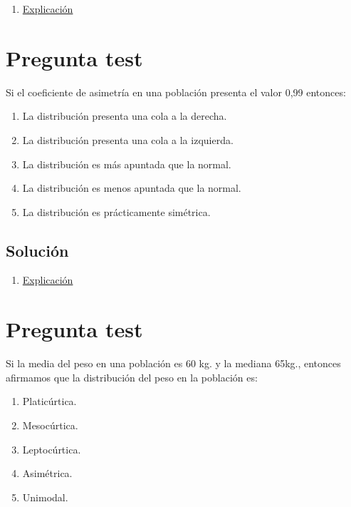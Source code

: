 \documentclass[
]{book}
\providecommand{\tightlist}{%
  \setlength{\itemsep}{0pt}\setlength{\parskip}{0pt}}
\begin{document}
\begin{enumerate}
\def\labelenumi{\alph{enumi})}
\setcounter{enumi}{4}
\tightlist
\item
  \href{https://en.wikipedia.org/wiki/Coefficient_of_variation}{Explicación}
\end{enumerate}

\hypertarget{pregunta-test-43}{%
\section{Pregunta test}\label{pregunta-test-43}}

Si el coeficiente de asimetría en una población presenta el valor 0,99 entonces:

\begin{enumerate}
\def\labelenumi{\alph{enumi})}
\tightlist
\item
  La distribución presenta una cola a la derecha.
\item
  La distribución presenta una cola a la izquierda.
\item
  La distribución es más apuntada que la normal.
\item
  La distribución es menos apuntada que la normal.
\item
  La distribución es prácticamente simétrica.
\end{enumerate}

\hypertarget{soluciuxf3n-45}{%
\subsection{Solución}\label{soluciuxf3n-45}}

\begin{enumerate}
\def\labelenumi{\alph{enumi})}
\tightlist
\item
  \href{https://1fjmanzano.github.io/bioestadistica/medidas-de-forma.html}{Explicación}
\end{enumerate}

\hypertarget{pregunta-test-44}{%
\section{Pregunta test}\label{pregunta-test-44}}

Si la media del peso en una población es 60 kg. y la mediana 65kg., entonces afirmamos que la distribución del peso en la población es:

\begin{enumerate}
\def\labelenumi{\alph{enumi})}
\tightlist
\item
  Platicúrtica.
\item
  Mesocúrtica.
\item
  Leptocúrtica.
\item
  Asimétrica.
\item
  Unimodal.
\end{enumerate}
\end{document}
